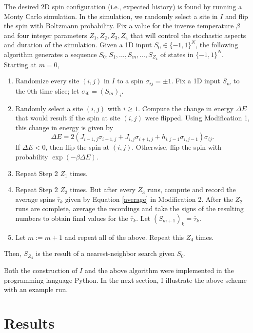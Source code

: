 \documentclass[12pt]{article}
\newcommand{\taubar}{\bar{\tau}}
\begin{document}
The desired 2D spin configuration (i.e., expected history) is found by running a Monty Carlo simulation. In the simulation, we randomly select a site in $I$ and flip the spin with Boltzmann probability. Fix a value for the inverse temperature $\beta$ and four integer parameters $Z_1,Z_2,Z_3,Z_4$ that will control the stochastic aspects and duration of the simulation. Given a 1D input $S_0\in\{-1,1\}^N$, the following algorithm generates a sequence $S_0,S_1,\ldots,S_m,\ldots,S_{Z_4}$ of states in $\{-1,1\}^N$. Starting at $m=0$,
\begin{enumerate}
\item Randomize every site $(i,j)$ in $I$ to a spin $\sigma_{ij}=\pm 1$. Fix a 1D input $S_m$ to the $0$th time slice; let $\sigma_{i0} = (S_m)_i$.
\item Randomly select a site $(i,j)$ with $i\geq 1$. Compute the change in energy $\Delta E$ that would result if the spin at site $(i,j)$ were flipped. Using Modification 1, this change in energy is given by
\begin{equation} \label{DeltaE}
\Delta E = 2(J_{i-1,j}\sigma_{i-1,j}+J_{i,j}\sigma_{i+1,j}+h_{i,j-1}\sigma_{i,j-1})\sigma_{ij}.
\end{equation}
If $\Delta E <0$, then flip the spin at $(i,j)$. Otherwise, flip the spin with probability $\exp(-\beta\Delta E)$.
\item Repeat Step 2 $Z_1$ times.
\item Repeat Step 2 $Z_2$ times. But after every $Z_3$ runs, compute and record the average spins $\taubar_k$ given by Equation \eqref{average} in Modification 2. After the $Z_2$ runs are complete, average the recordings and take the signs of the resulting numbers to obtain final values for the $\taubar_k$. Let $(S_{m+1})_k = \taubar_k$.
\item Let $m:= m+1$ and repeat all of the above. Repeat this $Z_4$ times.
\end{enumerate}
Then, $S_{Z_4}$ is the result of a nearest-neighbor search given $S_0$.

Both the construction of $I$ and the above algorithm were implemented in the programming language Python. In the next section, I illustrate the above scheme with an example run.

\section{Results}
\end{document}

